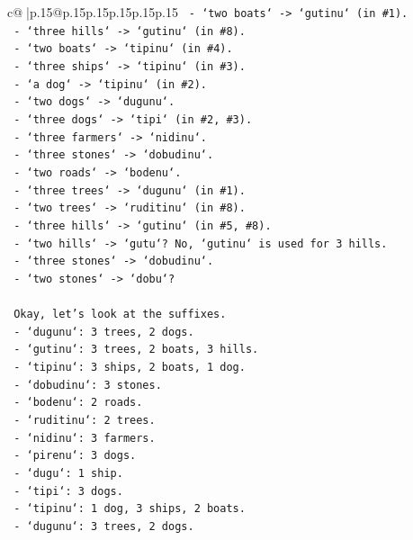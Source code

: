 \documentclass{article}
\begin{document}
{\begin{supertabular}{c@{$\;$}|p{.15\linewidth}@{}p{.15\linewidth}p{.15\linewidth}p{.15\linewidth}p{.15\linewidth}p{.15\linewidth}}
{{{\texttt{   {-} `two boats` {-}> `gutinu` (in \#1).} \\
\texttt{   {-} `three hills` {-}> `gutinu` (in \#8).} \\
\texttt{   {-} `two boats` {-}> `tipinu` (in \#4).} \\
\texttt{   {-} `three ships` {-}> `tipinu` (in \#3).} \\
\texttt{   {-} `a dog` {-}> `tipinu` (in \#2).} \\
\texttt{   {-} `two dogs` {-}> `dugunu`.} \\
\texttt{   {-} `three dogs` {-}> `tipi` (in \#2, \#3).} \\
\texttt{   {-} `three farmers` {-}> `nidinu`.} \\
\texttt{   {-} `three stones` {-}> `dobudinu`.} \\
\texttt{   {-} `two roads` {-}> `bodenu`.} \\
\texttt{   {-} `three trees` {-}> `dugunu` (in \#1).} \\
\texttt{   {-} `two trees` {-}> `ruditinu` (in \#8).} \\
\texttt{   {-} `three hills` {-}> `gutinu` (in \#5, \#8).} \\
\texttt{   {-} `two hills` {-}> `gutu`? No, `gutinu` is used for 3 hills.} \\
\texttt{   {-} `three stones` {-}> `dobudinu`.} \\
\texttt{   {-} `two stones` {-}> `dobu`?} \\
\\ 
\texttt{   Okay, let's look at the suffixes.} \\
\texttt{   {-} `dugunu`: 3 trees, 2 dogs.} \\
\texttt{   {-} `gutinu`: 3 trees, 2 boats, 3 hills.} \\
\texttt{   {-} `tipinu`: 3 ships, 2 boats, 1 dog.} \\
\texttt{   {-} `dobudinu`: 3 stones.} \\
\texttt{   {-} `bodenu`: 2 roads.} \\
\texttt{   {-} `ruditinu`: 2 trees.} \\
\texttt{   {-} `nidinu`: 3 farmers.} \\
\texttt{   {-} `pirenu`: 3 dogs.} \\
\texttt{   {-} `dugu`: 1 ship.} \\
\texttt{   {-} `tipi`: 3 dogs.} \\
\texttt{   {-} `tipinu`: 1 dog, 3 ships, 2 boats.} \\
\texttt{   {-} `dugunu`: 3 trees, 2 dogs.} \\
}}}
\end{supertabular}}
\end{document}
